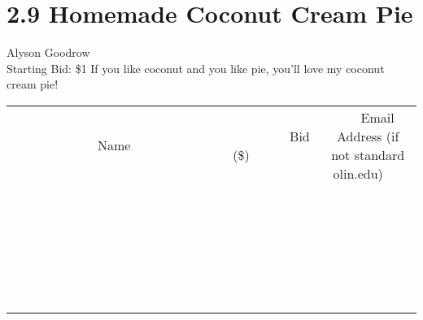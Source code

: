 \documentclass[11pt]{article}
\begin{document}
\section*{2.9 Homemade Coconut Cream Pie}
Alyson Goodrow
\\
Starting Bid: \$1
\newline
If you like coconut and you like pie, you'll love my coconut cream pie!
\\[6ex]
\begin{tabular}{c c c}
~~~~~~~~~~~~~Name~~~~~~~~~~~~~ & ~~~~~~~~~Bid (\$)~~~~~~~~~  & ~~~Email Address (if not standard olin.edu)~~~\\
 & & \\
\hline
 & & \\
\hline
 & & \\
\hline
 & & \\
\hline
 & & \\
\hline
 & & \\
\hline
 & & \\
\hline
 & & \\
\hline
 & & \\
\hline
 & & \\
\hline
 & & \\
\hline
 & & \\
\hline
 & & \\
\hline
 & & \\
\hline
 & & \\
\hline
 & & \\
\hline
 & & \\
\hline
 & & \\
\hline
 & & \\
\hline
 & & \\
\hline
 & & \\
\hline
 & & \\
\hline
 & & \\
\hline
 & & \\
\hline
 & & \\
\hline
 & & \\
\hline
\end{tabular}
\newpage
\end{document}
